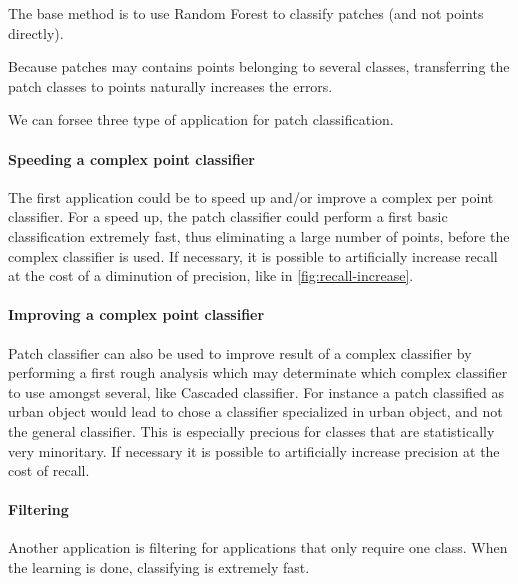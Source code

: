 			The base method is to use Random Forest to classify patches (and not points directly).
			
			Because patches may contains points belonging to several classes, transferring the patch classes to points naturally increases the errors.
			
			We can forsee three type of application for patch classification.
			
			\paragraph{Speeding a complex point classifier}
				The first application could be to speed up and/or improve a complex per point classifier.
				For a speed up, the patch classifier could perform a first basic classification extremely fast, thus eliminating a large number of points, before the complex classifier is used. 
				If necessary, it is possible to artificially increase recall at the cost of a diminution of precision, like in \ref{fig:recall-increase}.
				 
				
			\paragraph{Improving a complex point classifier}
				Patch classifier can also be used to improve result of a complex classifier by performing a first rough analysis which may determinate which complex classifier to use amongst several, like Cascaded classifier.
				For instance a patch classified as urban object would lead to chose a classifier specialized in urban object, and not the general classifier. This is especially precious for classes that are statistically very minoritary.
				If necessary it is possible to artificially increase precision at the cost of recall.
				
				
				
			\paragraph{Filtering}
				Another application is filtering for applications that only require one class. When the learning is done, classifying is extremely fast.
				
